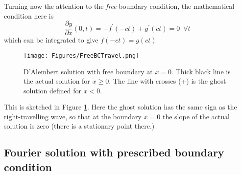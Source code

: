 \medskip \medskip 

\noindent Turning now the attention to the \emph{free} boundary condition, the mathematical condition here is
\begin{equation}
\frac{\partial y}{\partial x}(0,t)=-f^\prime(-ct)+g^\prime(ct) = 0 \,\,\, \forall t
\end{equation}
which can be integrated to give $f(-ct)=g(ct)$
\begin{figure}[hbt]
\texttt{[image: Figures/FreeBCTravel.png]}
\caption{D'Alembert solution with free boundary at $x=0$. Thick black line is the actual solution for $x\geq 0$. The line with crosses (+) is the ghost solution defined for $x<0$.}\label{fig:DalFree}
\end{figure}
This is sketched in Figure \ref{fig:DalFree}. Here the ghost solution has the same sign as the right-travelling wave, so that at the boundary $x=0$ the slope of the actual solution is zero (there is a stationary point there.)


\subsection{Fourier solution with prescribed boundary condition}

